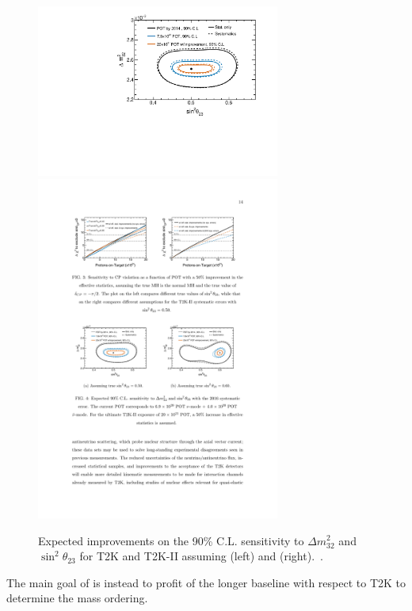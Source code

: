 \begin{figure} [htbp!]
\begin{center}
\includegraphics[width=8cm]{figures/t2kpre_t23dm32_point1_wreactorthrow.pdf}
\includegraphics[width=8cm]{figures/t2kpre_t23dm32_point2_wreactorthrow.pdf}
\caption{\label{fig:t2k2th23} Expected improvements on the 90\% C.L. sensitivity to $\Delta m^2_{32}$ and $\sin^2\theta_{23}$
for T2K and T2K-II assuming  (left) and  (right).~\cite{Abe:2016tez}.}
\end{center}
\end{figure}

The main goal of \nova is instead to profit of the longer baseline with respect to T2K to determine the mass ordering. 

